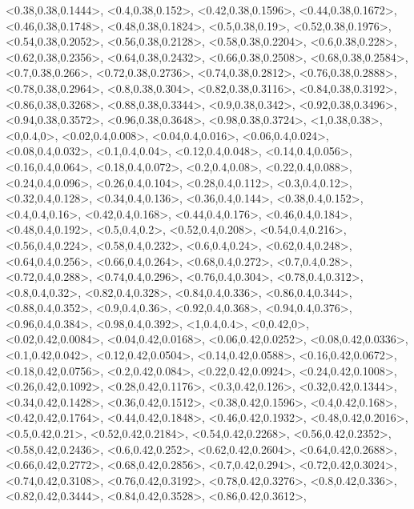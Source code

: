 \documentclass[a4paper,10pt]{article}
\begin{document}
\begin{eulernotebook}
\begin{euleroutput}
  <0.38,0.38,0.1444>,
  <0.4,0.38,0.152>,
  <0.42,0.38,0.1596>,
  <0.44,0.38,0.1672>,
  <0.46,0.38,0.1748>,
  <0.48,0.38,0.1824>,
  <0.5,0.38,0.19>,
  <0.52,0.38,0.1976>,
  <0.54,0.38,0.2052>,
  <0.56,0.38,0.2128>,
  <0.58,0.38,0.2204>,
  <0.6,0.38,0.228>,
  <0.62,0.38,0.2356>,
  <0.64,0.38,0.2432>,
  <0.66,0.38,0.2508>,
  <0.68,0.38,0.2584>,
  <0.7,0.38,0.266>,
  <0.72,0.38,0.2736>,
  <0.74,0.38,0.2812>,
  <0.76,0.38,0.2888>,
  <0.78,0.38,0.2964>,
  <0.8,0.38,0.304>,
  <0.82,0.38,0.3116>,
  <0.84,0.38,0.3192>,
  <0.86,0.38,0.3268>,
  <0.88,0.38,0.3344>,
  <0.9,0.38,0.342>,
  <0.92,0.38,0.3496>,
  <0.94,0.38,0.3572>,
  <0.96,0.38,0.3648>,
  <0.98,0.38,0.3724>,
  <1,0.38,0.38>,
  <0,0.4,0>,
  <0.02,0.4,0.008>,
  <0.04,0.4,0.016>,
  <0.06,0.4,0.024>,
  <0.08,0.4,0.032>,
  <0.1,0.4,0.04>,
  <0.12,0.4,0.048>,
  <0.14,0.4,0.056>,
  <0.16,0.4,0.064>,
  <0.18,0.4,0.072>,
  <0.2,0.4,0.08>,
  <0.22,0.4,0.088>,
  <0.24,0.4,0.096>,
  <0.26,0.4,0.104>,
  <0.28,0.4,0.112>,
  <0.3,0.4,0.12>,
  <0.32,0.4,0.128>,
  <0.34,0.4,0.136>,
  <0.36,0.4,0.144>,
  <0.38,0.4,0.152>,
  <0.4,0.4,0.16>,
  <0.42,0.4,0.168>,
  <0.44,0.4,0.176>,
  <0.46,0.4,0.184>,
  <0.48,0.4,0.192>,
  <0.5,0.4,0.2>,
  <0.52,0.4,0.208>,
  <0.54,0.4,0.216>,
  <0.56,0.4,0.224>,
  <0.58,0.4,0.232>,
  <0.6,0.4,0.24>,
  <0.62,0.4,0.248>,
  <0.64,0.4,0.256>,
  <0.66,0.4,0.264>,
  <0.68,0.4,0.272>,
  <0.7,0.4,0.28>,
  <0.72,0.4,0.288>,
  <0.74,0.4,0.296>,
  <0.76,0.4,0.304>,
  <0.78,0.4,0.312>,
  <0.8,0.4,0.32>,
  <0.82,0.4,0.328>,
  <0.84,0.4,0.336>,
  <0.86,0.4,0.344>,
  <0.88,0.4,0.352>,
  <0.9,0.4,0.36>,
  <0.92,0.4,0.368>,
  <0.94,0.4,0.376>,
  <0.96,0.4,0.384>,
  <0.98,0.4,0.392>,
  <1,0.4,0.4>,
  <0,0.42,0>,
  <0.02,0.42,0.0084>,
  <0.04,0.42,0.0168>,
  <0.06,0.42,0.0252>,
  <0.08,0.42,0.0336>,
  <0.1,0.42,0.042>,
  <0.12,0.42,0.0504>,
  <0.14,0.42,0.0588>,
  <0.16,0.42,0.0672>,
  <0.18,0.42,0.0756>,
  <0.2,0.42,0.084>,
  <0.22,0.42,0.0924>,
  <0.24,0.42,0.1008>,
  <0.26,0.42,0.1092>,
  <0.28,0.42,0.1176>,
  <0.3,0.42,0.126>,
  <0.32,0.42,0.1344>,
  <0.34,0.42,0.1428>,
  <0.36,0.42,0.1512>,
  <0.38,0.42,0.1596>,
  <0.4,0.42,0.168>,
  <0.42,0.42,0.1764>,
  <0.44,0.42,0.1848>,
  <0.46,0.42,0.1932>,
  <0.48,0.42,0.2016>,
  <0.5,0.42,0.21>,
  <0.52,0.42,0.2184>,
  <0.54,0.42,0.2268>,
  <0.56,0.42,0.2352>,
  <0.58,0.42,0.2436>,
  <0.6,0.42,0.252>,
  <0.62,0.42,0.2604>,
  <0.64,0.42,0.2688>,
  <0.66,0.42,0.2772>,
  <0.68,0.42,0.2856>,
  <0.7,0.42,0.294>,
  <0.72,0.42,0.3024>,
  <0.74,0.42,0.3108>,
  <0.76,0.42,0.3192>,
  <0.78,0.42,0.3276>,
  <0.8,0.42,0.336>,
  <0.82,0.42,0.3444>,
  <0.84,0.42,0.3528>,
  <0.86,0.42,0.3612>,

\end{euleroutput}
\end{eulernotebook}
\end{document}

